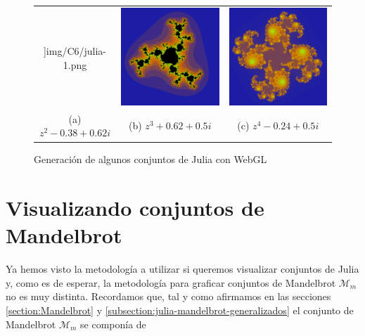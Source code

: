 \begin{figure}[ht]
\begin{tabular}{ccc}
]{img/C6/julia-1.png} &   \includegraphics[scale=0.2]{img/C6/julia-2.png} &   \includegraphics[scale=0.2]{img/C6/julia-3.png} \\
    (a) $z^2-0.38+0.62i$ & (b) $z^3+0.62+0.5i$ & (c) $z^4-0.24+0.5i$ \\[6pt]
    \end{tabular}
    \caption{Generación de algunos conjuntos de Julia con WebGL}
    \label{fig:julia-webgl}
\end{figure}

\section{Visualizando conjuntos de Mandelbrot}

Ya hemos visto la metodología a utilizar si queremos visualizar conjuntos de Julia y, como es de esperar, la metodología para graficar conjuntos de Mandelbrot $\mathcal{M}_m$ no es muy distinta. Recordamos que, tal y como afirmamos en las secciones \ref{section:Mandelbrot} y \ref{subsection:julia-mandelbrot-generalizados} el conjunto de Mandelbrot $\mathcal{M}_m$ se componía de